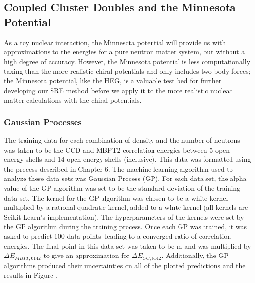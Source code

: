 \subsection*{Coupled Cluster Doubles and the Minnesota Potential}
As a toy nuclear interaction, the Minnesota potential will provide us with approximations to the energies for a pure neutron matter system, but without a high degree of accuracy. However, the Minnesota potential is less computationally taxing than the more realistic chiral potentials and only includes two-body forces; the Minnesota potential, like the HEG, is a valuable test bed for further developing our SRE method before we apply it to the more realistic nuclear matter calculations with the chiral potentials.

\subsubsection*{Gaussian Processes}
The training data for each combination of density and the number of neutrons was taken to be the CCD and MBPT2 correlation energies between 5 open energy shells and 14 open energy shells (inclusive). This data was formatted using the process described in Chapter 6. The machine learning algorithm used to analyze these data sets was Gaussian Process (GP). For each data set, the alpha value of the GP algorithm was set to be the standard deviation of the training data set. The kernel for the GP algorithm was chosen to be a white kernel multiplied by a rational quadratic kernel, added to a white kernel (all kernels are Scikit-Learn's implementation). The hyperparameters of the kernels were set by the GP algorithm during the training process. Once each GP was trained, it was asked to predict 100 data points, leading to a converged ratio of correlation energies. The final point in this data set was taken to be m and was multiplied by $\Delta E_{MBPT,6142}$ to give an approximation for $\Delta E_{CC,6142}$. Additionally, the GP algorithms produced their uncertainties on all of the plotted predictions and the results in Figure \label{pnm_mp_all}.

